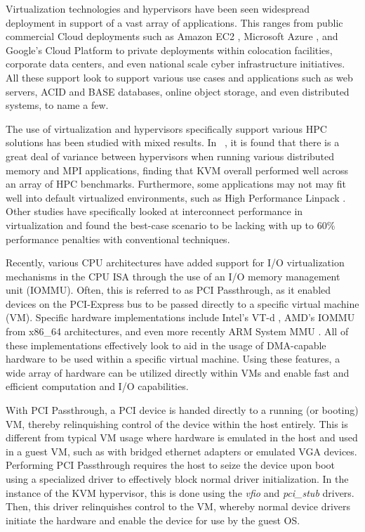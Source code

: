Virtualization technologies and hypervisors have been seen widespread deployment in support of a vast array of applications.  This ranges from public commercial Cloud deployments such as Amazon EC2 \cite{hazelhurst2008scientific,amazon2010}, Microsoft Azure \cite{jennings2010cloud}, and Google's Cloud Platform \cite{www-google-platform} to private deployments within colocation facilities, corporate data centers, and even national scale cyber infrastructure initiatives.  All these support look to support various use cases and applications such as web servers, ACID and BASE databases, online object storage, and even distributed systems, to name a few.  

The use of virtualization and hypervisors specifically support various HPC solutions has been studied with mixed results.  In ~\cite{Younge2011cloud}, it is found that there is a great deal of variance between hypervisors when running various distributed memory and MPI applications, finding that KVM overall performed well across an array of HPC benchmarks.  Furthermore, some applications may not may fit well into default virtualized environments, such as High Performance Linpack \cite{Luszczek:2011:EHC}. Other studies have specifically looked at interconnect performance in virtualization and found the best-case scenario to be lacking \cite{Ramakrishnan2012} with up to 60\% performance penalties with conventional techniques.
 
Recently, various CPU architectures have added support for I/O virtualization mechanisms in the CPU ISA through the use of an I/O memory management unit (IOMMU). Often, this is referred to as PCI Passthrough, as it enabled devices on the PCI-Express bus to be passed directly to a specific virtual machine (VM).  Specific hardware implementations include Intel's VT-d \cite{intelvirtualization}, AMD's IOMMU \cite{amdiommu} from x86\_64 architectures, and even more recently ARM System MMU \cite{armmmu}.  All of these implementations effectively look to aid in the usage of DMA-capable hardware to be used within a specific virtual machine. Using these features, a wide array of hardware can be utilized directly within VMs and enable fast and efficient computation and I/O capabilities.

With PCI Passthrough, a PCI device is handed directly to a running (or booting) VM, thereby relinquishing control of the device within the host entirely. This is different from typical VM usage where hardware is emulated in the host and used in a guest VM, such as with bridged ethernet adapters or emulated VGA devices. Performing PCI Passthrough requires the host to seize the device upon boot using a specialized driver to effectively block normal driver initialization. In the instance of the KVM hypervisor, this is done using the \emph{vfio} and \emph{pci\_stub} drivers. Then, this driver relinquishes control to the VM, whereby normal device drivers initiate the hardware and enable the device for use by the guest OS.  

